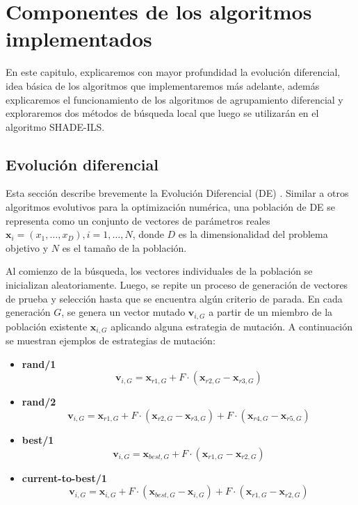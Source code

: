 
\chapter{Componentes de los algoritmos implementados}

En este capitulo, explicaremos con mayor profundidad la evolución diferencial, idea básica de los algoritmos que implementaremos más adelante, además explicaremos el funcionamiento de los algoritmos de agrupamiento diferencial y exploraremos dos métodos de búsqueda local que luego se utilizarán en el algoritmo SHADE-ILS.

\section{Evolución diferencial}

Esta sección describe brevemente la Evolución Diferencial (DE) \cite{DE}. Similar a otros algoritmos evolutivos para la optimización numérica, una población de DE se representa como un conjunto de vectores de parámetros reales \( \mathbf{x}_i = (x_{1}, \ldots, x_{D}), i = 1, \ldots, N \), donde \( D \) es la dimensionalidad del problema objetivo y \( N \) es el tamaño de la población. 

Al comienzo de la búsqueda, los vectores individuales de la población se inicializan aleatoriamente. Luego, se repite un proceso de generación de vectores de prueba y selección hasta que se encuentra algún criterio de parada. En cada generación \( G \), se genera un vector mutado \( \mathbf{v}_{i,G} \) a partir de un miembro de la población existente \( \mathbf{x}_{i,G} \) aplicando alguna estrategia de mutación. A continuación se muestran ejemplos de estrategias de mutación:

\begin{itemize}
    \item \textbf{rand/1}
    \[
    \mathbf{v}_{i,G} = \mathbf{x}_{r1,G} + F \cdot (\mathbf{x}_{r2,G} - \mathbf{x}_{r3,G})
    \]

    \item \textbf{rand/2}
    \[
    \mathbf{v}_{i,G} = \mathbf{x}_{r1,G} + F \cdot (\mathbf{x}_{r2,G} - \mathbf{x}_{r3,G}) + F \cdot (\mathbf{x}_{r4,G} - \mathbf{x}_{r5,G})
    \]

    \item \textbf{best/1}
    \[
    \mathbf{v}_{i,G} = \mathbf{x}_{best,G} + F \cdot (\mathbf{x}_{r1,G} - \mathbf{x}_{r2,G})
    \]

    \item \textbf{current-to-best/1}
    \[
    \mathbf{v}_{i,G} = \mathbf{x}_{i,G} + F \cdot (\mathbf{x}_{best,G} - \mathbf{x}_{i,G}) + F \cdot (\mathbf{x}_{r1,G} - \mathbf{x}_{r2,G})
    \]
\end{itemize}

